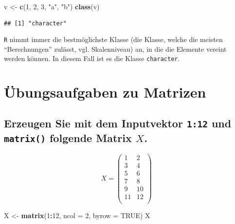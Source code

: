 \documentclass[12pt,a4paper]{article}
\newenvironment{Shaded}{\begin{snugshade}}{\end{snugshade}}
\newcommand{\AttributeTok}[1]{\textcolor[rgb]{0.13,0.29,0.53}{#1}}
\newcommand{\ConstantTok}[1]{\textcolor[rgb]{0.56,0.35,0.01}{#1}}
\newcommand{\DecValTok}[1]{\textcolor[rgb]{0.00,0.00,0.81}{#1}}
\newcommand{\FunctionTok}[1]{\textcolor[rgb]{0.13,0.29,0.53}{\textbf{#1}}}
\newcommand{\NormalTok}[1]{#1}
\newcommand{\OtherTok}[1]{\textcolor[rgb]{0.56,0.35,0.01}{#1}}
\newcommand{\SpecialCharTok}[1]{\textcolor[rgb]{0.81,0.36,0.00}{\textbf{#1}}}
\newcommand{\StringTok}[1]{\textcolor[rgb]{0.31,0.60,0.02}{#1}}
\begin{document}
\begin{Shaded}
\begin{Highlighting}[]
\NormalTok{    v }\OtherTok{\textless{}{-}} \FunctionTok{c}\NormalTok{(}\DecValTok{1}\NormalTok{, }\DecValTok{2}\NormalTok{, }\DecValTok{3}\NormalTok{, }\StringTok{"a"}\NormalTok{, }\StringTok{"b"}\NormalTok{)}
    \FunctionTok{class}\NormalTok{(v)}
\end{Highlighting}
\end{Shaded}

\begin{verbatim}
## [1] "character"
\end{verbatim}

\texttt{R} nimmt immer die bestmöglichste Klasse (die Klasse, welche die
meisten ``Berechnungen'' zulässt, vgl. Skalenniveau) an, in die die
Elemente vereint werden können. In diesem Fall ist es die Klasse
\texttt{character}.

\vspace{0.5cm}

\hypertarget{uxfcbungsaufgaben-zu-matrizen}{%
\section{Übungsaufgaben zu
Matrizen}\label{uxfcbungsaufgaben-zu-matrizen}}

\hypertarget{erzeugen-sie-mit-dem-inputvektor-112-und-folgende-matrix-x.}{%
\subsection{\texorpdfstring{Erzeugen Sie mit dem Inputvektor
\texttt{1:12} und \texttt{matrix()} folgende Matrix
\(X\).}{Erzeugen Sie mit dem Inputvektor 1:12 und  folgende Matrix X.}}\label{erzeugen-sie-mit-dem-inputvektor-112-und-folgende-matrix-x.}}

\[ X = \begin{pmatrix} 1 & 2 \\ 3 & 4\\ 5 & 6 \\ 7 & 8 \\
9 & 10 \\ 11 & 12 \\\end{pmatrix}\]

\begin{Shaded}
\begin{Highlighting}[]
\NormalTok{    X }\OtherTok{\textless{}{-}} \FunctionTok{matrix}\NormalTok{(}\DecValTok{1}\SpecialCharTok{:}\DecValTok{12}\NormalTok{, }\AttributeTok{ncol =} \DecValTok{2}\NormalTok{, }\AttributeTok{byrow =} \ConstantTok{TRUE}\NormalTok{)}
\NormalTok{    X}
\end{Highlighting}
\end{Shaded}
\end{document}
